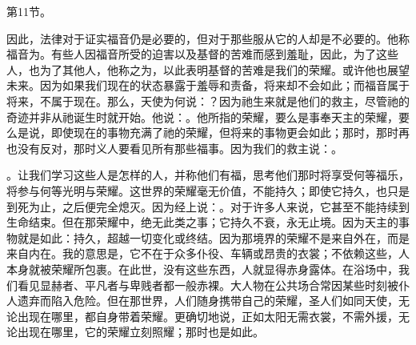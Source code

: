 第11节。\par

因此，法律对于证实福音仍是必要的，但对于那些服从它的人却是不必要的。他称福音为。有些人因福音所受的迫害以及基督的苦难而感到羞耻，因此，为了这些人，也为了其他人，他称之为，以此表明基督的苦难是我们的荣耀。或许他也展望未来。因为如果我们现在的状态暴露于羞辱和责备，将来却不会如此；而福音属于将来，不属于现在。那么，天使为何说：？因为祂生来就是他们的救主，尽管祂的奇迹并非从祂诞生时就开始。他说：。他所指的荣耀，要么是事奉天主的荣耀，要么是说，即使现在的事物充满了祂的荣耀，但将来的事物更会如此；那时，那时再也没有反对，那时义人要看见所有那些福事。因为我们的救主说：。\par

。让我们学习这些人是怎样的人，并称他们有福，思考他们那时将享受何等福乐，将参与何等光明与荣耀。这世界的荣耀毫无价值，不能持久；即使它持久，也只是到死为止，之后便完全熄灭。因为经上说：。对于许多人来说，它甚至不能持续到生命结束。但在那荣耀中，绝无此类之事；它持久不衰，永无止境。因为天主的事物就是如此：持久，超越一切变化或终结。因为那境界的荣耀不是来自外在，而是来自内在。我的意思是，它不在于众多仆役、车辆或昂贵的衣裳；不依赖这些，人本身就被荣耀所包裹。在此世，没有这些东西，人就显得赤身露体。在浴场中，我们看见显赫者、平凡者与卑贱者都一般赤裸。大人物在公共场合常因某些时刻被仆人遗弃而陷入危险。但在那世界，人们随身携带自己的荣耀，圣人们如同天使，无论出现在哪里，都自身带着荣耀。更确切地说，正如太阳无需衣裳，不需外援，无论出现在哪里，它的荣耀立刻照耀；那时也是如此。\par


